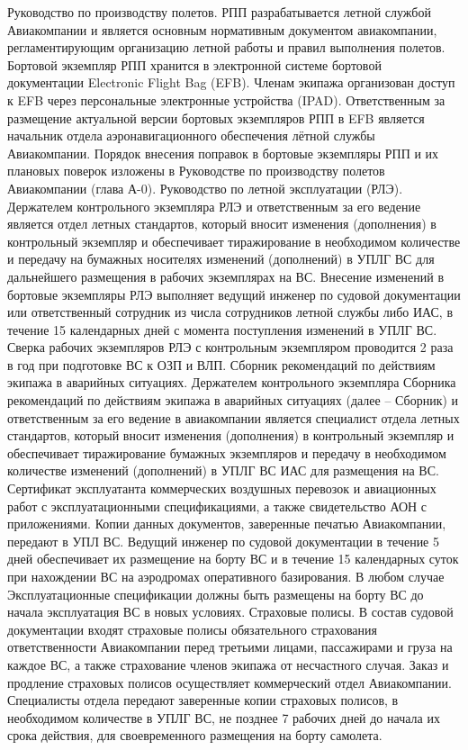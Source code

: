 Руководство по производству полетов. 
РПП разрабатывается летной службой Авиакомпании и является основным нормативным документом авиакомпании, регламентирующим организацию летной работы и правил выполнения полетов.
Бортовой экземпляр РПП хранится в электронной системе бортовой документации Electronic Flight Bag (EFB). Членам экипажа организован доступ к EFB через персональные электронные устройства (IPAD). 
Ответственным за размещение актуальной версии бортовых экземпляров РПП в EFB является начальник отдела аэронавигационного обеспечения лётной службы Авиакомпании.
Порядок внесения поправок в бортовые экземпляры РПП и их плановых поверок изложены в Руководстве по производству полетов Авиакомпании (глава А-0).
Руководство по летной эксплуатации (РЛЭ).
Держателем контрольного экземпляра РЛЭ и ответственным за его ведение является отдел летных стандартов, который вносит изменения (дополнения) в контрольный экземпляр и обеспечивает тиражирование в необходимом количестве и передачу на бумажных носителях изменений (дополнений) в УПЛГ ВС для дальнейшего размещения в рабочих экземплярах на ВС.
Внесение изменений в бортовые экземпляры РЛЭ выполняет ведущий инженер по судовой документации или ответственный сотрудник из числа сотрудников летной службы либо ИАС, в течение 15 календарных дней с момента поступления изменений в УПЛГ ВС. 
Сверка рабочих экземпляров РЛЭ с контрольным экземпляром проводится 2 раза в год при подготовке ВС к ОЗП и ВЛП. 
Сборник рекомендаций по действиям экипажа в аварийных ситуациях. 
Держателем контрольного экземпляра Сборника рекомендаций по действиям экипажа в аварийных ситуациях (далее – Сборник) и ответственным за его ведение в авиакомпании является специалист отдела летных стандартов, который вносит изменения (дополнения) в контрольный экземпляр и обеспечивает тиражирование бумажных экземпляров и передачу в необходимом количестве изменений (дополнений) в УПЛГ ВС ИАС для размещения на ВС.  
Сертификат эксплуатанта коммерческих воздушных перевозок и авиационных работ с эксплуатационными спецификациями, а также свидетельство АОН с приложениями.
Копии данных документов, заверенные печатью Авиакомпании, передают в УПЛ ВС. Ведущий инженер по судовой документации в течение 5 дней обеспечивает их размещение на борту ВС и в течение 15 календарных суток при нахождении ВС на аэродромах оперативного базирования. В любом случае Эксплуатационные спецификации должны быть размещены на борту ВС до начала эксплуатация ВС в новых условиях.
 Страховые полисы.
В состав судовой документации входят страховые полисы обязательного страхования ответственности Авиакомпании перед третьими лицами, пассажирами и груза на каждое ВС, а также страхование членов экипажа от несчастного случая. Заказ и продление страховых полисов осуществляет коммерческий отдел Авиакомпании. Специалисты отдела передают заверенные копии страховых полисов, в необходимом количестве в УПЛГ ВС, не позднее 7 рабочих дней до начала их срока действия, для своевременного размещения на борту самолета. 
